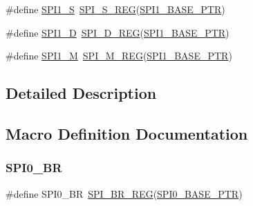 \begin{DoxyCompactItemize}
\item 
\#define \hyperlink{group___s_p_i___register___accessor___macros_ga5e490d3dc9f5812324f2ade33ae7d2e4}{S\+P\+I1\+\_\+S}~\hyperlink{group___s_p_i___register___accessor___macros_ga19d81f95fe621c7c2a42a6686131f9c2}{S\+P\+I\+\_\+\+S\+\_\+\+R\+EG}(\hyperlink{group___s_p_i___peripheral_gae28fd789e0602a32076c1c13ca39f5af}{S\+P\+I1\+\_\+\+B\+A\+S\+E\+\_\+\+P\+TR})
\item 
\#define \hyperlink{group___s_p_i___register___accessor___macros_ga8760cd86fbace95539c11d135eb57011}{S\+P\+I1\+\_\+D}~\hyperlink{group___s_p_i___register___accessor___macros_ga78694fa47ead59b8be3620b96600a223}{S\+P\+I\+\_\+\+D\+\_\+\+R\+EG}(\hyperlink{group___s_p_i___peripheral_gae28fd789e0602a32076c1c13ca39f5af}{S\+P\+I1\+\_\+\+B\+A\+S\+E\+\_\+\+P\+TR})
\item 
\#define \hyperlink{group___s_p_i___register___accessor___macros_ga95f41b6dc0418cb02ecbe3143b66caa3}{S\+P\+I1\+\_\+M}~\hyperlink{group___s_p_i___register___accessor___macros_ga1647c87dc9d038f003a2c3456aa6c508}{S\+P\+I\+\_\+\+M\+\_\+\+R\+EG}(\hyperlink{group___s_p_i___peripheral_gae28fd789e0602a32076c1c13ca39f5af}{S\+P\+I1\+\_\+\+B\+A\+S\+E\+\_\+\+P\+TR})
\end{DoxyCompactItemize}


\subsection{Detailed Description}


\subsection{Macro Definition Documentation}
\mbox{\label{group___s_p_i___register___accessor___macros_ga93e98222b0b06341f341376cc7a4b39a}} 
\subsubsection{\texorpdfstring{S\+P\+I0\+\_\+\+BR}{SPI0\_BR}}
{\footnotesize\ttfamily \#define S\+P\+I0\+\_\+\+BR~\hyperlink{group___s_p_i___register___accessor___macros_ga6cf6551cb2fa5b60d6dfbe7544ef7ec7}{S\+P\+I\+\_\+\+B\+R\+\_\+\+R\+EG}(\hyperlink{group___s_p_i___peripheral_ga851f64a97b5919c1f99a34db5918b3b4}{S\+P\+I0\+\_\+\+B\+A\+S\+E\+\_\+\+P\+TR})}

